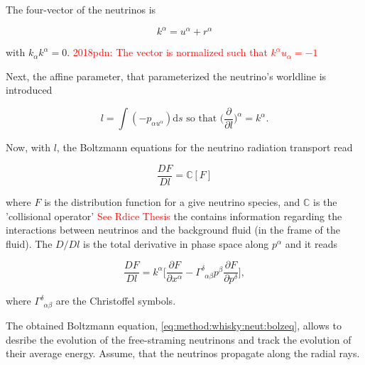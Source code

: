 \documentclass[11pt,a4paper,headinclude=true,DIV=14,BCOR=8mm,chapterprefix,listof=totoc,twoside,openright,abstracton]{scrbook}
\newcommand{\red}[1]{\textcolor{red}{#1}}
\newcommand{\dd}{\text{d}}
\begin{document}
The four-vector of the neutrinos is

\begin{equation}
\label{eq:method:whisky:neut:k}
k^{\alpha} = u^{\alpha} + r^{\alpha}
\end{equation}

with $k_{\alpha}k^{\alpha} = 0$.
\red{2018pdn: The vector is normalized such that $k^{\alpha}u_{\alpha}=-1$}

Next, the affine parameter, that parameterized the neutrino's worldline is introduced

\begin{equation}
l = \int (-p_{\alpha u^{\alpha}})\dd s \text{ so that } \Big( \frac{\partial}{\partial l} \Big)^{\alpha} = k^{\alpha}.
\end{equation}

Now, with $l$, the Boltzmann equations for the neutrino radiation transport read \cite{Thorne:1981}

\begin{equation}
\frac{D F}{D l} = \mathbb{C}[F]
\end{equation}

where $F$ is the distribution function for a give neutrino species, and $\mathbb{C}$ is the
'collisional operator' \red{See Rdice Thesis} the contains information regarding the interactions between neutrinos and the background fluid (in the frame of the fluid). 
The $D/Dl$ is the total derivative in phase space along $p^{\alpha}$ and it reads 

\begin{equation}
\label{eq:method:whisky:neut:bolzeq}
\frac{DF}{Dl} = k^{\alpha} \Big[ \frac{\partial F}{\partial x^{\alpha}} - \Gamma^{\delta}_{\:\:\alpha\beta}p^{\beta}\frac{\partial F}{\partial p^{\delta}} \Big],
\end{equation}

where $\Gamma^{\delta}_{\:\:\alpha\beta}$ are the Christoffel symbols.




The obtained Boltzmann equation, \eqref{eq:method:whisky:neut:bolzeq}, allows to desribe the evolution of the free-straming neutrinons and track the evolution of their average energy.
Assume, that the neutrinos propagate along the radial rays. 
\end{document}
